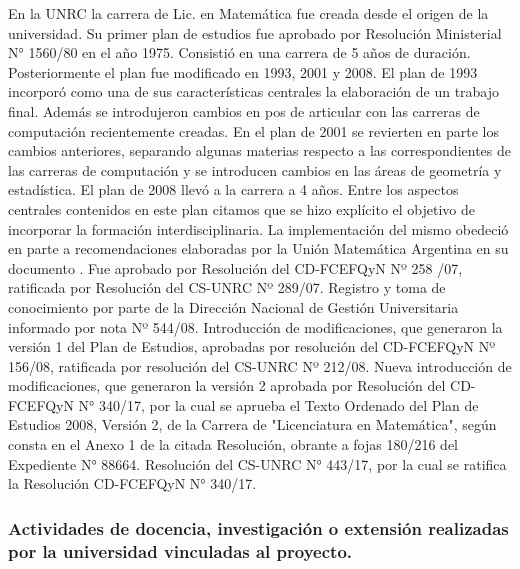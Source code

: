 \documentclass[a4paper, 12pt]{article}
\begin{document}
 En la UNRC la carrera de Lic. en Matemática fue creada desde el origen de la universidad. Su primer plan de estudios fue aprobado por Resolución Ministerial  N° 1560/80 en el año 1975. Consistió en una carrera de 5 años de duración. Posteriormente el plan fue modificado en 1993, 2001 y 2008. El plan de 1993 incorporó como una de sus características centrales la elaboración de un trabajo final. Además se introdujeron cambios en pos de articular con las carreras de computación recientemente creadas.  En el plan de 2001 se revierten en parte los cambios anteriores, separando algunas  materias respecto a las correspondientes de las carreras de  computación y se introducen cambios en las áreas de geometría y estadística.  
 El plan de  2008 llevó a la carrera a 4 años. Entre los aspectos centrales contenidos en este plan citamos que se hizo explícito el objetivo de incorporar la formación interdisciplinaria. La implementación del mismo obedeció en parte a recomendaciones elaboradas por la Unión Matemática Argentina en su documento \cite{uma}.  Fue aprobado por Resolución del CD-FCEFQyN Nº 258 /07, ratificada 
por Resolución del CS-UNRC Nº 289/07. Registro y toma de conocimiento 
por parte de la Dirección Nacional de Gestión Universitaria informado por nota 
Nº 544/08. Introducción de modificaciones, que generaron la versión 1 del Plan 
de Estudios, aprobadas por resolución del CD-FCEFQyN Nº 156/08, 
ratificada por resolución del CS-UNRC Nº 212/08.  Nueva introducción de modificaciones, que generaron la versión 2 aprobada por Resolución del CD-FCEFQyN N° 340/17, por la cual se aprueba el Texto Ordenado del Plan de Estudios 2008, Versión 2, de la Carrera de "Licenciatura en Matemática", según consta en el Anexo 1 de la citada Resolución, obrante a fojas 180/216 del Expediente N° 88664.  Resolución del CS-UNRC N° 443/17, por la cual se ratifica la Resolución  CD-FCEFQyN N° 340/17.  




\subsubsection{Actividades de docencia, investigación o extensión realizadas por la universidad vinculadas  al proyecto.}
\end{document}
